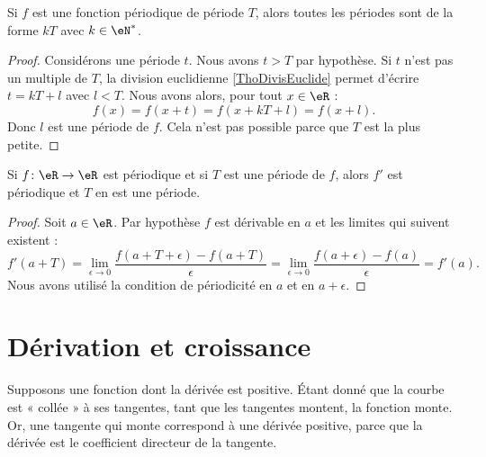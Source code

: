 \begin{lemma}        \label{LEMooOGFGooCnTDjO}
    Si \( f\) est une fonction périodique de période \( T\), alors toutes les périodes sont de la forme \( kT\) avec \( k\in \eN^*\).
\end{lemma}

\begin{proof}
    Considérons une période \( t\). Nous avons \( t>T\) par hypothèse. Si \( t\) n'est pas un multiple de \( T\), la division euclidienne \ref{ThoDivisEuclide} permet d'écrire \( t=kT+l\) avec \( l<T\). Nous avons alors, pour tout \( x\in \eR\) :
    \begin{equation}
        f(x)=f(x+t)=f(x+kT+l)=f(x+l).
    \end{equation}
    Donc \( l\) est une période de \( f\). Cela n'est pas possible parce que \( T\) est la plus petite.
\end{proof}

\begin{lemma}       \label{LEMooHWQYooXcNLts}
    Si \( f\colon \eR\to \eR\) est périodique et si \( T\) est une période de \( f\), alors \( f'\) est périodique et \( T\) en est une période.    
\end{lemma}

\begin{proof}
    Soit \( a\in \eR\). Par hypothèse \( f\) est dérivable en \( a\) et les limites qui suivent existent :
    \begin{equation}
        f'(a+T)=\lim_{\epsilon\to 0}\frac{ f(a+T+\epsilon)-f(a+T) }{ \epsilon }=\lim_{\epsilon\to 0}\frac{ f(a+\epsilon)-f(a) }{ \epsilon }=f'(a).
    \end{equation}
    Nous avons utilisé la condition de périodicité en \( a\) et en \( a+\epsilon\).
\end{proof}

\section{Dérivation et croissance}

Supposons une fonction dont la dérivée est positive. Étant donné que la courbe est « collée » à ses tangentes, tant que les tangentes montent, la fonction monte. Or, une tangente qui monte correspond à une dérivée positive, parce que la dérivée est le coefficient directeur de la tangente.

